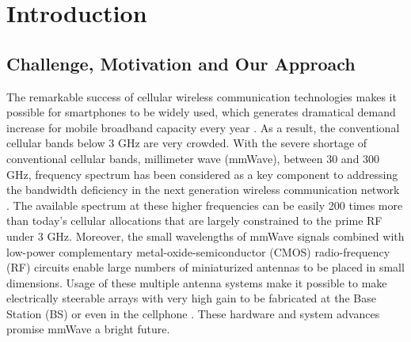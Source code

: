 \chapter{Introduction}\label{ch:Intro}
\section{Challenge, Motivation and Our Approach}
\label{sec:1}
\par The remarkable success of cellular wireless communication technologies makes it possible for smartphones to be widely used, which generates dramatical demand increase for mobile broadband capacity every year \cite{index2013global, cerwall2011ericsson, pujol2011mobile}. As a result, the conventional cellular bands below 3 GHz are very crowded. With the severe shortage of conventional cellular bands, millimeter wave (mmWave), between $30$ and $300$ GHz, frequency spectrum has been considered as a key component to addressing the bandwidth deficiency in the next generation wireless communication network \cite{khan2011mmwave, pi2011introduction, rappaport2011state, pietraski2012millimeter, rangan2014millimeter}. The available spectrum at these higher frequencies can be easily 200 times more than today's cellular allocations that are largely constrained to the prime RF under 3 GHz. Moreover, the small wavelengths of mmWave signals combined with low-power complementary metal-oxide-semiconductor (CMOS) radio-frequency (RF) circuits enable large numbers of miniaturized antennas to be placed in small dimensions. Usage of these multiple antenna systems make it possible to make electrically steerable arrays with very high gain to be fabricated at the Base Station (BS) or even in the cellphone \cite{doan2004design, zhang2009antenna, gutierrez2009chip, rajagopal2011antenna}. These hardware and system advances promise mmWave a bright future.
